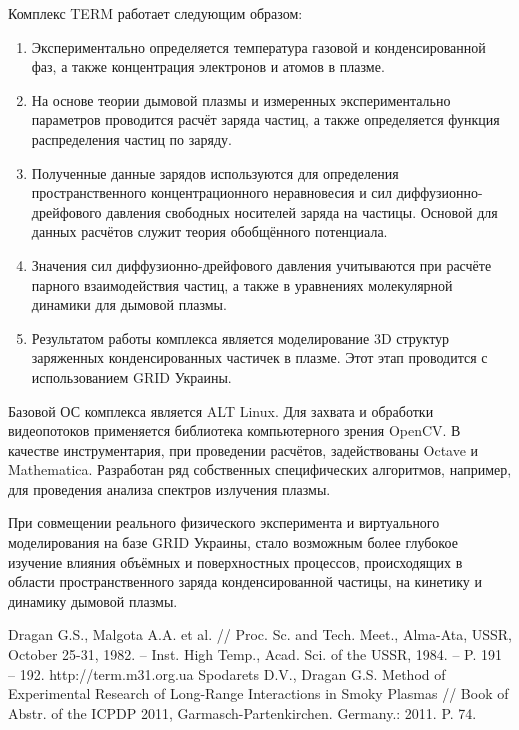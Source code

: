 \documentclass[10pt, a5paper]{article}
\begin{document}
Комплекс TERM работает следующим образом:
\begin{enumerate}
	\item Экспериментально определяется температура газовой и конденсированной фаз, а также концентрация электронов и атомов в плазме.
	\item На основе теории дымовой плазмы и измеренных экспериментально параметров проводится расчёт заряда частиц, а также определяется функция распределения частиц по заряду.
	\item Полученные данные зарядов используются для определения пространственного концентрационного неравновесия и сил \linebreak диффузионно-дрейфового давления свободных носителей заряда на частицы. Основой для данных расчётов служит теория обобщённого потенциала.
	\item Значения сил диффузионно-дрейфового давления учитываются при  расчёте парного взаимодействия частиц, а также в уравнениях молекулярной динамики для дымовой плазмы.
	\item Результатом работы комплекса является моделирование 3D структур заряженных конденсированных частичек в плазме. Этот этап проводится с использованием GRID Украины.
\end{enumerate}
Базовой ОС комплекса является ALT Linux. Для захвата и обработки видеопотоков применяется библиотека компьютерного зрения OpenCV. В качестве инструментария, при проведении расчётов, задействованы Octave и Mathematica. Разработан ряд собственных специфических алгоритмов, например, для проведения анализа спектров излучения плазмы. 

При совмещении реального физического эксперимента и виртуального моделирования на базе GRID Украины, стало возможным более глубокое изучение влияния объёмных и поверхностных процессов, происходящих в области пространственного заряда конденсированной частицы, на кинетику и динамику дымовой плазмы.
\begin{thebibliography}{9}
	Dragan G.S., Malgota A.A. et al. // Proc. Sc. and Tech. Meet., Alma-Ata, USSR, October 25-31, 1982. – Inst. High Temp., Acad. Sci. of the USSR, 1984. – P. 191 – 192. 
	 http://term.m31.org.ua
	 Spodarets D.V., Dragan G.S. Method of Experimental Research of Long-Range Interactions in Smoky Plasmas // Book of Abstr. of the ICPDP 2011, Garmasch-Partenkirchen. Germany.: 2011. P. 74. 
\end{thebibliography}
\end{document}
